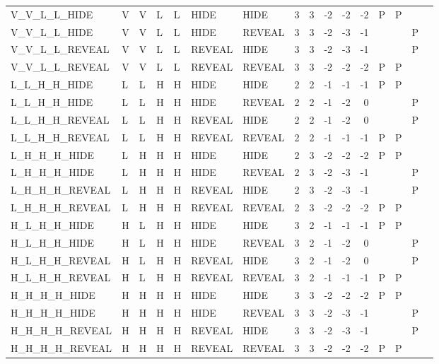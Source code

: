 \begin{longtable}{lllllllrrrrrllll}
  V\_V\_L\_L\_HIDE & V & V & L & L & HIDE & HIDE & 3 & 3 & -2 & -2 & -2 & P & P &  &  \\ 
  V\_V\_L\_L\_HIDE & V & V & L & L & HIDE & REVEAL & 3 & 3 & -2 & -3 & -1 &  &  & P &  \\ 
  V\_V\_L\_L\_REVEAL & V & V & L & L & REVEAL & HIDE & 3 & 3 & -2 & -3 & -1 &  &  & P &  \\ 
  V\_V\_L\_L\_REVEAL & V & V & L & L & REVEAL & REVEAL & 3 & 3 & -2 & -2 & -2 & P & P &  &  \\ 
  L\_L\_H\_H\_HIDE & L & L & H & H & HIDE & HIDE & 2 & 2 & -1 & -1 & -1 & P & P &  &  \\ 
  L\_L\_H\_H\_HIDE & L & L & H & H & HIDE & REVEAL & 2 & 2 & -1 & -2 & 0 &  &  & P &  \\ 
  L\_L\_H\_H\_REVEAL & L & L & H & H & REVEAL & HIDE & 2 & 2 & -1 & -2 & 0 &  &  & P &  \\ 
  L\_L\_H\_H\_REVEAL & L & L & H & H & REVEAL & REVEAL & 2 & 2 & -1 & -1 & -1 & P & P &  &  \\ 
  L\_H\_H\_H\_HIDE & L & H & H & H & HIDE & HIDE & 2 & 3 & -2 & -2 & -2 & P & P &  &  \\ 
  L\_H\_H\_H\_HIDE & L & H & H & H & HIDE & REVEAL & 2 & 3 & -2 & -3 & -1 &  &  & P &  \\ 
  L\_H\_H\_H\_REVEAL & L & H & H & H & REVEAL & HIDE & 2 & 3 & -2 & -3 & -1 &  &  & P &  \\ 
  L\_H\_H\_H\_REVEAL & L & H & H & H & REVEAL & REVEAL & 2 & 3 & -2 & -2 & -2 & P & P &  &  \\ 
  H\_L\_H\_H\_HIDE & H & L & H & H & HIDE & HIDE & 3 & 2 & -1 & -1 & -1 & P & P &  &  \\ 
  H\_L\_H\_H\_HIDE & H & L & H & H & HIDE & REVEAL & 3 & 2 & -1 & -2 & 0 &  &  & P &  \\ 
  H\_L\_H\_H\_REVEAL & H & L & H & H & REVEAL & HIDE & 3 & 2 & -1 & -2 & 0 &  &  & P &  \\ 
  H\_L\_H\_H\_REVEAL & H & L & H & H & REVEAL & REVEAL & 3 & 2 & -1 & -1 & -1 & P & P &  &  \\ 
  H\_H\_H\_H\_HIDE & H & H & H & H & HIDE & HIDE & 3 & 3 & -2 & -2 & -2 & P & P &  &  \\ 
  H\_H\_H\_H\_HIDE & H & H & H & H & HIDE & REVEAL & 3 & 3 & -2 & -3 & -1 &  &  & P &  \\ 
  H\_H\_H\_H\_REVEAL & H & H & H & H & REVEAL & HIDE & 3 & 3 & -2 & -3 & -1 &  &  & P &  \\ 
  H\_H\_H\_H\_REVEAL & H & H & H & H & REVEAL & REVEAL & 3 & 3 & -2 & -2 & -2 & P & P &  &  \\ 

\end{longtable}
